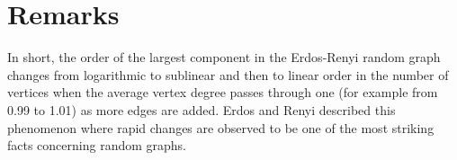\section{Remarks}
In short, the order of the largest component in the Erdos-Renyi random graph changes from logarithmic to sublinear and then to linear order in the number of vertices when the average vertex degree passes through one (for example from 0.99 to 1.01) as more edges are added. Erdos and Renyi described this phenomenon where rapid changes are observed to be one of the most striking facts concerning random graphs.